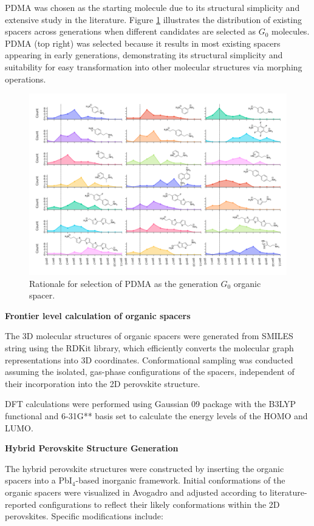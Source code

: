 PDMA was chosen as the starting molecule due to its structural simplicity and extensive study in the literature. Figure \ref{fig:figure3.9} illustrates the distribution of existing spacers across generations when different candidates are selected as $G_0$ molecules. PDMA (top right) was selected because it results in most existing spacers appearing in early generations, demonstrating its structural simplicity and suitability for easy transformation into other molecular structures via morphing operations.


\begin{figure}[ht]
    \centering
    \includegraphics[width=\textwidth]{figures/methodology/figure3-8.png}
    \caption{Rationale for selection of PDMA as the generation $G_0$ organic spacer.}
    \label{fig:figure3.9}
\end{figure}


\textbf{Frontier level calculation of organic spacers}

The 3D molecular structures of organic spacers were generated from SMILES string using the RDKit library, which efficiently converts the molecular graph representations into 3D coordinates. Conformational sampling was conducted assuming the isolated, gas-phase configurations of the spacers, independent of their incorporation into the 2D perovskite structure. 

DFT calculations were performed using Gaussian 09 package with the B3LYP functional and 6-31G** basis set to calculate the energy levels of the HOMO and LUMO.

\textbf{Hybrid Perovskite Structure Generation}

The hybrid perovskite structures were constructed by inserting the organic spacers into a PbI$_4$-based inorganic framework. Initial conformations of the organic spacers were visualized in Avogadro and adjusted according to literature-reported configurations to reflect their likely conformations within the 2D perovskites. Specific modifications include: 

